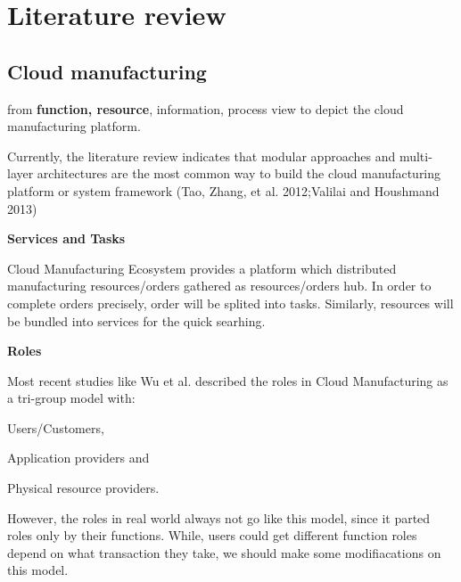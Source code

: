 \section{Literature review} %
\label{sec:literature_review}

\subsection{Cloud manufacturing} %
\label{sub:cloud_manufacturing}
from \textbf{function, resource}, information, process view to depict the cloud manufacturing platform.

Currently, the literature review indicates that modular approaches and multi-layer architectures are the most common way to build the cloud manufacturing platform or system framework (Tao, Zhang, et al. 2012;Valilai and Houshmand 2013)




\textbf{Services and Tasks}

Cloud Manufacturing Ecosystem provides a platform which distributed manufacturing resources/orders gathered as resources/orders hub. In order to complete orders precisely, order will be splited into tasks. Similarly, resources will be bundled into services for the quick searhing.

\textbf{Roles}

Most recent studies like Wu et al.\cite{Wu2013} described the roles in Cloud Manufacturing as a tri-group model with:\begin{inparaenum}[1)]
\item Users/Customers,
\item Application providers and
\item Physical resource providers.
\end{inparaenum}
However, the roles in real world always not go like this model, since it parted roles only by their functions. While, users could get different function roles depend on what transaction they take, we should make some modifiacations on this model.

